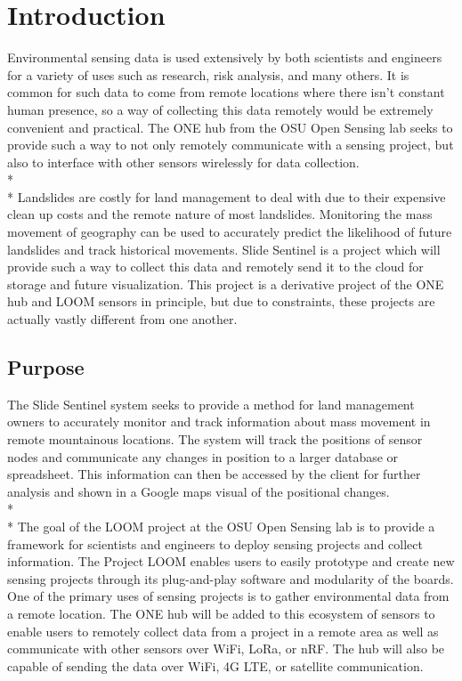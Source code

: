 \documentclass[onecolumn, draftclsnofoot,10pt, compsoc]{IEEEtran}
\begin{document}
\newpage
{}
\tableofcontents
\clearpage



\section{Introduction}
Environmental sensing data is used extensively by both scientists and engineers for a variety of uses such as research, risk analysis, and many others. It is common for such data to come from remote locations where there isn't constant human presence, so a way of collecting this data remotely would be extremely convenient and practical. The ONE hub from the OSU Open Sensing lab seeks to provide such a way to not only remotely communicate with a sensing project, but also to interface with other sensors wirelessly for data collection.
\\* \\*
Landslides are costly for land management to deal with due to their expensive clean up costs and the remote nature of most landslides. Monitoring the mass movement of geography can be used to accurately predict the likelihood of future landslides and track historical movements. Slide Sentinel is a project which will provide such a way to collect this data and remotely send it to the cloud for storage and future visualization. This project is a derivative project of the ONE hub and LOOM sensors in principle, but due to constraints, these projects are actually vastly different from one another.


\subsection{Purpose}
The Slide Sentinel system seeks to provide a method for land management owners to accurately monitor and track information about mass movement in remote mountainous locations. The system will track the positions of sensor nodes and communicate any changes in position to a larger database or spreadsheet. This information can then be accessed by the client for further analysis and shown in a Google maps visual of the positional changes.
\\* \\*
The goal of the LOOM project at the OSU Open Sensing lab is to provide a framework for scientists and engineers to deploy sensing projects and collect information. The Project LOOM enables users to easily prototype and create new sensing projects through its plug-and-play software and modularity of the boards. One of the primary uses of sensing projects is to gather environmental data from a remote location. The ONE hub will be added to this ecosystem of sensors to enable users to remotely collect data from a project in a remote area as well as communicate with other sensors over WiFi, LoRa, or nRF. The hub will also be capable of sending the data over WiFi, 4G LTE, or satellite communication. 
\end{document}
